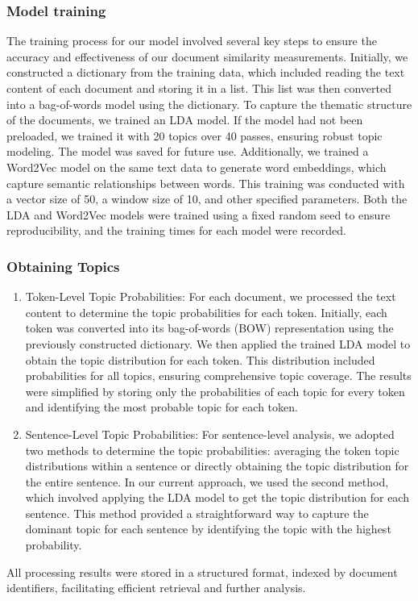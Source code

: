 \documentclass[UTF8]{ctexart}
\begin{document}
\subsubsection{Model training}
{
    The training process for our model involved several key steps to ensure the accuracy and effectiveness of our document similarity measurements. 
    Initially, we constructed a dictionary from the training data, which included reading the text content of each document and storing it in a list. 
    This list was then converted into a bag-of-words model using the dictionary. To capture the thematic structure of the documents, 
    we trained an LDA model. If the model had not been preloaded, we trained it with 20 topics over 40 passes, ensuring robust topic modeling. 
    The model was saved for future use. Additionally, we trained a Word2Vec model on the same text data to generate word embeddings,
    which capture semantic relationships between words. This training was conducted with a vector size of 50, 
    a window size of 10, and other specified parameters. 
    Both the LDA and Word2Vec models were trained using a fixed random seed to ensure reproducibility, 
    and the training times for each model were recorded.
}

\subsubsection{Obtaining Topics}
{
    \begin{enumerate}
        \item {Token-Level Topic Probabilities:}{
            For each document, we processed the text content to determine the topic probabilities for each token. 
            Initially, each token was converted into its bag-of-words (BOW) representation using the previously constructed dictionary. 
            We then applied the trained LDA model to obtain the topic distribution for each token. 
            This distribution included probabilities for all topics, ensuring comprehensive topic coverage. 
            The results were simplified by storing only the probabilities of each
            topic for every token and identifying the most probable topic for each token.
        }
        \item {Sentence-Level Topic Probabilities:}{
            For sentence-level analysis, we adopted two methods to determine the topic probabilities: 
            averaging the token topic distributions within a sentence or directly obtaining the topic distribution for the entire sentence.
            In our current approach, we used the second method, which involved applying the LDA model to get the topic distribution for each sentence. 
            This method provided a straightforward way to capture the dominant topic for each sentence by identifying the topic with the highest probability.
        }
    \end{enumerate}

    All processing results were stored in a structured format, indexed by document identifiers, facilitating efficient retrieval and further analysis.
}
\end{document}
